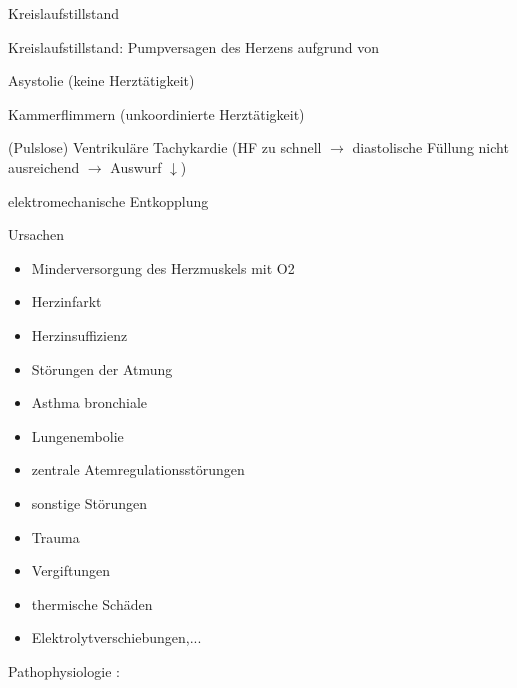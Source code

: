 \documentclass{article}
\begin{document}
\label{bkm:RefHeading42514602}Kreislaufstillstand

Kreislaufstillstand: Pumpversagen des Herzens aufgrund von

Asystolie (keine Herzt\"atigkeit)

Kammerflimmern (unkoordinierte Herzt\"atigkeit)

(Pulslose) Ventrikul\"are Tachykardie (HF zu schnell ${\rightarrow}$
diastolische F\"ullung nicht ausreichend ${\rightarrow}$ Auswurf
${\downarrow}$)

elektromechanische Entkopplung 

Ursachen

\begin{itemize}
\item Minderversorgung des Herzmuskels mit O2

\end{itemize}
\begin{itemize}
\item Herzinfarkt

\item Herzinsuffizienz

\end{itemize}
\begin{itemize}
\item St\"orungen der Atmung

\end{itemize}
\begin{itemize}
\item Asthma bronchiale

\item Lungenembolie

\item zentrale Atemregulationsst\"orungen

\end{itemize}
\begin{itemize}
\item sonstige St\"orungen

\end{itemize}
\begin{itemize}
\item Trauma

\item Vergiftungen

\item thermische Sch\"aden

\item Elektrolytverschiebungen,...

\end{itemize}
Pathophysiologie :
\end{document}
